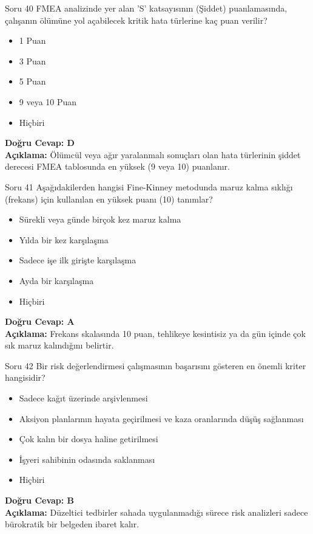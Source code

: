 \documentclass[12pt,a4paper]{article}
\begin{document}
\begin{testcard}{Soru 40}
    FMEA analizinde yer alan 'S' katsayısının (Şiddet) puanlamasında, çalışanın ölümüne yol açabilecek kritik hata türlerine kaç puan verilir?
    \begin{itemize}
        \item[A)] 1 Puan
        \item[B)] 3 Puan
        \item[C)] 5 Puan
        \item[D)] 9 veya 10 Puan
        \item[E)] Hiçbiri
    \end{itemize}
    \tcblower
    \textbf{Doğru Cevap: D} \\
    \textbf{Açıklama:} Ölümcül veya ağır yaralanmalı sonuçları olan hata türlerinin şiddet derecesi FMEA tablosunda en yüksek (9 veya 10) puanlanır.
\end{testcard}

\begin{testcard}{Soru 41}
    Aşağıdakilerden hangisi Fine-Kinney metodunda maruz kalma sıklığı (frekans) için kullanılan en yüksek puanı (10) tanımlar?
    \begin{itemize}
        \item[A)] Sürekli veya günde birçok kez maruz kalma
        \item[B)] Yılda bir kez karşılaşma
        \item[C)] Sadece işe ilk girişte karşılaşma
        \item[D)] Ayda bir karşılaşma
        \item[E)] Hiçbiri
    \end{itemize}
    \tcblower
    \textbf{Doğru Cevap: A} \\
    \textbf{Açıklama:} Frekans skalasında 10 puan, tehlikeye kesintisiz ya da gün içinde çok sık maruz kalındığını belirtir.
\end{testcard}

\begin{testcard}{Soru 42}
    Bir risk değerlendirmesi çalışmasının başarısını gösteren en önemli kriter hangisidir?
    \begin{itemize}
        \item[A)] Sadece kağıt üzerinde arşivlenmesi
        \item[B)] Aksiyon planlarının hayata geçirilmesi ve kaza oranlarında düşüş sağlanması
        \item[C)] Çok kalın bir dosya haline getirilmesi
        \item[D)] İşyeri sahibinin odasında saklanması
        \item[E)] Hiçbiri
    \end{itemize}
    \tcblower
    \textbf{Doğru Cevap: B} \\
    \textbf{Açıklama:} Düzeltici tedbirler sahada uygulanmadığı sürece risk analizleri sadece bürokratik bir belgeden ibaret kalır.
\end{testcard}
\end{document}
